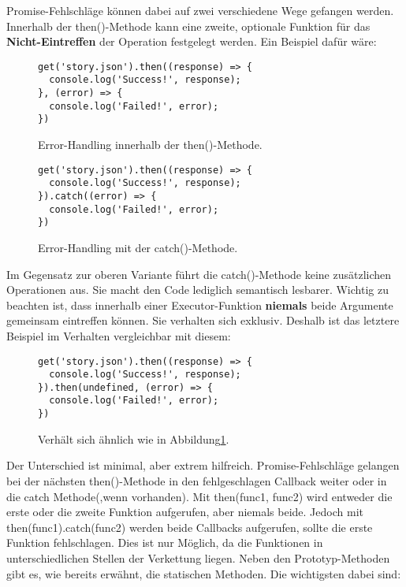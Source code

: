 \noindent
Promise-Fehlschläge können dabei auf zwei verschiedene Wege gefangen werden. Innerhalb der then()-Methode kann eine zweite, optionale Funktion für das \textbf{Nicht-Eintreffen} der Operation festgelegt werden. Ein Beispiel dafür wäre:

\begin{figure}[H]
\begin{lstlisting}[basicstyle=\small]
get('story.json').then((response) => {
  console.log('Success!', response);
}, (error) => {
  console.log('Failed!', error);
})
\end{lstlisting}
\caption{Error-Handling innerhalb der then()-Methode\cite{callback-vs-promises}.}
\end{figure}

\begin{figure}[H]
\begin{lstlisting}[basicstyle=\small]
get('story.json').then((response) => {
  console.log('Success!', response);
}).catch((error) => {
  console.log('Failed!', error);
})
\end{lstlisting}
\caption{Error-Handling mit der catch()-Methode\cite{callback-vs-promises}.}
\label{error-with-catch}
\end{figure}

\noindent
Im Gegensatz zur oberen Variante führt die catch()-Methode keine zusätzlichen Operationen aus. Sie macht den Code lediglich semantisch lesbarer. Wichtig zu beachten ist, dass innerhalb einer Executor-Funktion \textbf{niemals} beide Argumente gemeinsam eintreffen können. Sie verhalten sich exklusiv. Deshalb ist das letztere Beispiel im Verhalten vergleichbar mit diesem:

\begin{figure}[H]
\begin{lstlisting}[basicstyle=\small]
get('story.json').then((response) => {
  console.log('Success!', response);
}).then(undefined, (error) => {
  console.log('Failed!', error);
})
\end{lstlisting}
\caption{Verhält sich ähnlich wie in Abbildung\ref{error-with-catch}.}
\end{figure}

\noindent
Der Unterschied ist minimal, aber extrem hilfreich. Promise-Fehlschläge gelangen bei der nächsten then()-Methode in den fehlgeschlagen Callback weiter oder in die catch Methode(,wenn vorhanden). Mit then(func1, func2) wird entweder die erste oder die zweite Funktion aufgerufen, aber niemals beide. Jedoch mit then(func1).catch(func2) werden beide Callbacks aufgerufen, sollte die erste Funktion fehlschlagen. Dies ist nur Möglich, da die Funktionen in unterschiedlichen Stellen der Verkettung liegen. Neben den Prototyp-Methoden gibt es, wie bereits erwähnt, die statischen Methoden. Die wichtigsten dabei sind:

